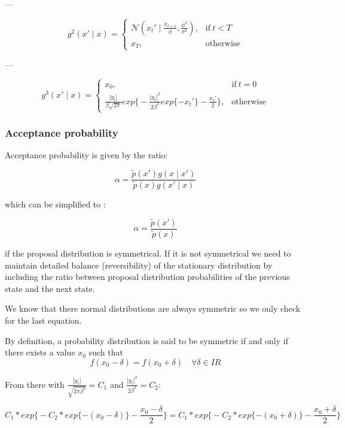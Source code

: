\documentclass[]{article}
\begin{document}
---

\begin{equation}
g^2(x' \mid x)=
\begin{cases}
\mathcal{N}(x_t' \mid \frac{x_{t+1}}{\phi}, \frac{\phi^2}{\sigma^2}), & \text{if}\ t<T \\
x_T , & \text{otherwise}
\end{cases}
\end{equation}

---

\begin{equation}
g^3(x' \mid x)=
\begin{cases}
x_0, & \text{if}\ t=0 \\
\frac{|y_t|}{\beta \sqrt{2 \pi}} exp \bigg\{ -\frac{|y_t|^2}{2 \beta^2} exp\{-x_t' \} - \frac{x_t'}{2} \bigg\}, & \text{otherwise}
\end{cases}
\end{equation}


\subsubsection*{Acceptance probability}

Acceptance probability is given by the ratio:

$$ \alpha = \frac{ \widetilde{p}(x')g(x \mid x') }{  \widetilde{p}(x)g(x' \mid x) }$$

which can be simplified to :

$$ \alpha = \frac{ \widetilde{p}(x')}{  \widetilde{p}(x) }$$

if the proposal distribution is symmetrical. If it is not symmetrical we need to maintain detailed balance (reversibility) of the stationary distribution by including the ratio between proposal distribution probabilities of the previous state and the next state. 

We know that there normal distributions are always symmetric so we only check for the last equation.

By definition, a probability distribution is said to be symmetric if and only if there exists a value $x_0$ such that 
$$ f(x_0 - \delta) = f(x_0 + \delta) \quad \forall \delta \in I\!R$$

From there with $\frac{|y_t|}{\sqrt{2 \pi \beta^2}} = C_1$ and $ \frac{|y_t|^2}{2 \beta^2} = C_2 $:

$$ C_1 * exp \bigg\{ -C_2 * exp\{-(x_0 - \delta) \} - \frac{x_0 - \delta}{2} \bigg\}  = C_1 * exp \bigg\{ -C_2 * exp\{-(x_0 + \delta) \} - \frac{x_0 + \delta}{2} \bigg\}$$
\end{document}
